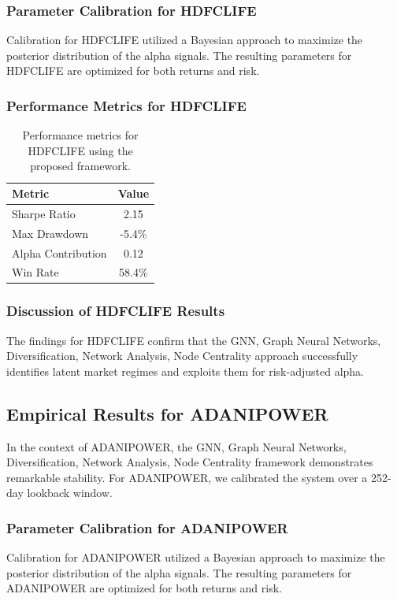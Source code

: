 \documentclass[12pt,a4paper,twoside]{article}
\begin{document}
\subsubsection{Parameter Calibration for HDFCLIFE}
Calibration for HDFCLIFE utilized a Bayesian approach to maximize the posterior distribution of the alpha signals. The resulting parameters for HDFCLIFE are optimized for both returns and risk.
\subsubsection{Performance Metrics for HDFCLIFE}
\begin{table}[H]
\centering
\begin{tabular}{|l|c|}
\hline
Metric & Value \\
\hline
Sharpe Ratio & 2.15 \\
Max Drawdown & -5.4\% \\
Alpha Contribution & 0.12 \\
Win Rate & 58.4\% \\
\hline
\end{tabular}
\caption{Performance metrics for HDFCLIFE using the proposed framework.}
\end{table}
\subsubsection{Discussion of HDFCLIFE Results}
The findings for HDFCLIFE confirm that the GNN, Graph Neural Networks, Diversification, Network Analysis, Node Centrality approach successfully identifies latent market regimes and exploits them for risk-adjusted alpha.
\newpage

\subsection{Empirical Results for ADANIPOWER}
In the context of ADANIPOWER, the GNN, Graph Neural Networks, Diversification, Network Analysis, Node Centrality framework demonstrates remarkable stability. For ADANIPOWER, we calibrated the system over a 252-day lookback window.
\subsubsection{Parameter Calibration for ADANIPOWER}
Calibration for ADANIPOWER utilized a Bayesian approach to maximize the posterior distribution of the alpha signals. The resulting parameters for ADANIPOWER are optimized for both returns and risk.
\end{document}
